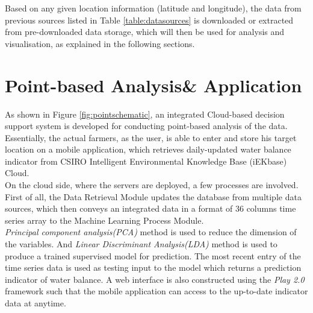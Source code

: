 \documentclass[12pt,journal,compsoc,onecolumn]{IEEEtran}
\begin{document}
\normalfont
Based on any given location information (latitude and longitude), the data from previous sources listed in Table \ref{table:datasources} is downloaded or extracted from pre-downloaded data storage, which will then be used for analysis and visualisation, as explained in the following sections.
\section{Point-based Analysis\& Application}
As shown in Figure \ref{fig:pointschematic}, an integrated Cloud-based decision support system is developed for conducting point-based analysis of the data. Essentially, the actual farmers, as the user, is able to enter and store his target location on a mobile application, which retrieves daily-updated water balance indicator from CSIRO Intelligent Environmental Knowledge Base (iEKbase) Cloud.\\
\newline
On the cloud side, where the servers are deployed, a few processes are involved. First of all, the Data Retrieval Module updates the database from multiple data sources, which then conveys an integrated data in a format of 36 columns time series array to the Machine Learning Process Module.\\
\newline
\emph{Principal component analysis(PCA)} method is used to reduce the dimension of the variables. And \emph{Linear Discriminant Analysis(LDA)} method is used to produce a trained supervised model for prediction. The most recent entry of the time series data is used as testing input to the model which returns a prediction indicator of water balance. A web interface is also constructed using the \emph{Play 2.0} framework such that the mobile application can access to the up-to-date indicator data at anytime. 
\end{document}
